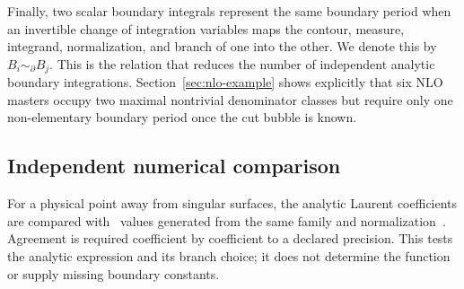 Finally, two scalar boundary integrals represent the same boundary period
when an invertible change of integration variables maps the contour, measure,
integrand, normalization, and branch of one into the other.  We denote this by
$B_i\sim_{\partial}B_j$.  This is the relation that reduces the number of
independent analytic boundary integrations.  Section~\ref{sec:nlo-example}
shows explicitly that six NLO masters occupy two maximal nontrivial
denominator classes but require only one non-elementary boundary period once
the cut bubble is known.

\subsection{Independent numerical comparison}

For a physical point away from singular surfaces, the analytic Laurent
coefficients are compared with \AMFlow\ values generated from the same family
and normalization~\cite{Liu:2020kpc}.  Agreement is required coefficient by
coefficient to a declared precision.  This tests the analytic expression and
its branch choice; it does not determine the function or supply missing
boundary constants.
